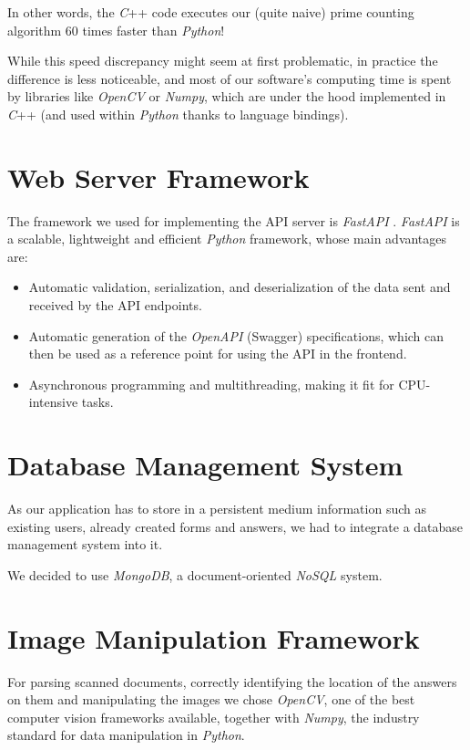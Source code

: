 \documentclass[11pt, a4paper]{report}
\begin{document}
In other words, the \textit{C}++ code executes our (quite naive) prime counting algorithm $60$ times faster than \textit{Python}!

While this speed discrepancy might seem at first problematic, in practice the difference is less noticeable, and most of our software's computing time is spent by libraries like \textit{OpenCV} or \textit{Numpy}, which are under the hood implemented in \textit{C}++ (and used within \textit{Python} thanks to language bindings).

\section{Web Server Framework}

The framework we used for implementing the API server is \textit{FastAPI} \cite{FastAPI}. \textit{FastAPI} is a scalable, lightweight and efficient \textit{Python} framework, whose main advantages are:
\begin{itemize}
    \item Automatic validation, serialization, and deserialization of the data sent and received by the API endpoints.
    \item Automatic generation of the \textit{OpenAPI} \cite{open-api} (Swagger) specifications, which can then be used as a reference point for using the API in the frontend.
    \item Asynchronous programming and multithreading, making it fit for CPU-intensive tasks.
\end{itemize}

\section{Database Management System}

As our application has to store in a persistent medium information such as existing users, already created forms and answers, we had to integrate a database management system into it.

We decided to use \textit{MongoDB}, a document-oriented \textit{NoSQL} system.

\section{Image Manipulation Framework}

For parsing scanned documents, correctly identifying the location of the answers on them and manipulating the images we chose \textit{OpenCV}, one of the best computer vision frameworks available, together with \textit{Numpy}, the industry standard for data manipulation in \textit{Python}.
\end{document}
